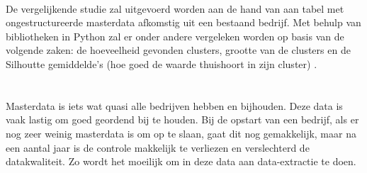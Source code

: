\\\indent
De vergelijkende studie zal uitgevoerd worden aan de hand van aan tabel met ongestructureerde masterdata afkomstig uit een bestaand bedrijf. Met behulp van bibliotheken in Python zal er onder andere vergeleken worden op basis van de volgende zaken: de hoeveelheid gevonden clusters, grootte van de clusters en de Silhoutte gemiddelde's (hoe goed de waarde thuishoort in zijn cluster) \autocite{Kaplan2022}.



\section{}%
\label{sec:probleemstelling}
Masterdata is iets wat quasi alle bedrijven hebben en bijhouden. Deze data is vaak lastig om goed geordend bij te houden. Bij de opstart van een bedrijf, als er nog zeer weinig masterdata is om op te slaan, gaat dit nog gemakkelijk, maar na een aantal jaar is de controle makkelijk te verliezen en verslechterd de datakwaliteit. Zo wordt het moeilijk om in deze data aan data-extractie te doen.



